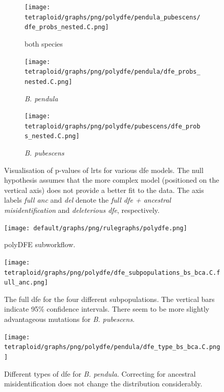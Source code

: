 \documentclass[hidelinks,11pt]{article}
\newcommand{\pendula}{\textit{B. pendula}}
\newcommand{\pubescens}{\textit{B. pubescens}}
\begin{document}
    \begin{figure}[ht]
        \centering
        \begin{subfigure}[b]{0.32\textwidth}
            \centering
            \texttt{[image: tetraploid/graphs/png/polydfe/pendula\_pubescens/dfe\_probs\_nested.C.png]}
            \caption{both species}
            \label{fig:probs_nested_pendula_pubescens}
        \end{subfigure}
        \hfill
        \begin{subfigure}[b]{0.32\textwidth}
            \centering
            \texttt{[image: tetraploid/graphs/png/polydfe/pendula/dfe\_probs\_nested.C.png]}
            \caption{\pendula{}}
            \label{fig:probs_nested_pendula}
        \end{subfigure}
        \hfill
        \begin{subfigure}[b]{0.32\textwidth}
            \centering
            \texttt{[image: tetraploid/graphs/png/polydfe/pubescens/dfe\_probs\_nested.C.png]}
            \caption{\pubescens{}}
            \label{fig:probs_nested_pubescens}
        \end{subfigure}
        \caption{Visualisation of p-values of \acrshort{lrt}s for various \acrshort{dfe} models. The null hypothesis assumes that the more complex model (positioned on the vertical axis) does not provide a better fit to the data. The axis labels \textit{full anc} and \textit{del} denote the \textit{full \acrshort{dfe} + ancestral misidentification} and \textit{deleterious \acrshort{dfe}}, respectively.}
        \label{fig:probs_nested}
    \end{figure}

    \begin{figure}[H]
        \centering
        \texttt{[image: default/graphs/png/rulegraphs/polydfe.png]}
        \caption{polyDFE subworkflow.}
    \end{figure}
    
    \begin{figure}[ht]
        \centering
        \texttt{[image: tetraploid/graphs/png/polydfe/dfe\_subpopulations\_bs\_bca.C.full\_anc.png]}
        \caption{The full \acrshort{dfe} for the four different subpopulations. The vertical bars indicate 95\% confidence intervals. There seem to be more slightly advantageous mutations for \pubescens{}.}
        \label{fig:dfe_subpopulations}
    \end{figure}
    
    \begin{figure}[ht]
        \centering
        \texttt{[image: tetraploid/graphs/png/polydfe/pendula/dfe\_type\_bs\_bca.C.png]}
        \caption{Different types of \acrshort{dfe} for \pendula{}. Correcting for ancestral misidentification does not change the distribution considerably.}
        \label{fig:dfe_type_C_pendula}
    \end{figure}
\end{document}
